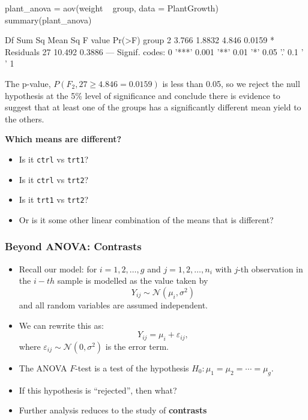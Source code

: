 \documentclass[a4paper]{article}\usepackage[]{graphicx}\usepackage[]{xcolor}
\begin{document}
\begin{Schunk}
\begin{Sinput}
plant_anova = aov(weight ~ group, data = PlantGrowth)
summary(plant_anova)
\end{Sinput}
\begin{Soutput}
            Df Sum Sq Mean Sq F value Pr(>F)  
group        2  3.766  1.8832   4.846 0.0159 *
Residuals   27 10.492  0.3886                 
---
Signif. codes:  0 '***' 0.001 '**' 0.01 '*' 0.05 '.' 0.1 ' ' 1
\end{Soutput}
\end{Schunk}
The p-value, \( P(F_2,27 \geq 4.846 = 0.0159) \) is less than 0.05, so we reject the null hypothesis at the 5\% level of significance and conclude there is evidence to suggest that at least one of the groups has a significantly different mean yield to the others.
\begin{greenbox}
	\textbf{Which means are different?}
	\begin{itemize}
		\item Is it \lstinline|ctrl| vs \lstinline|trt1|?
		\item Is it \lstinline|ctrl| vs \lstinline|trt2|?
		\item Is it \lstinline|trt1| vs \lstinline|trt2|?
		\item Or is it some other linear combination of the means that is different?
	\end{itemize}
\end{greenbox}
\subsubsection{Beyond ANOVA: Contrasts}
\begin{itemize}
	\item Recall our model: for \( i = 1,2,\dotsc,g \) and \( j = 1,2, \dotsc,n_i \) with \( j \)-th observation in the \( i-th \) sample is modelled as the value taken by
	\[
		Y_{ij} \sim \mathcal{N} (\mu_i,\sigma^2)
	\]
	and all random variables are assumed independent.
	\item We can rewrite this as:
	\[
		Y_{ij} = \mu_i + \varepsilon_{ij},
	\]
	where \( \varepsilon_{ij} \sim \mathcal{N}(0,\sigma^2) \) is the error term.
	\item The ANOVA \( F \)-test is a test of the hypothesis \( H_0: \mu_1 = \mu_2 = \dotsb = \mu_g \).
	\item If this hypothesis is ``rejected'', then what?
	\item Further analysis reduces to the study of \textcolor{mygreen}{\textbf{contrasts}}
\end{itemize}
\end{document}
